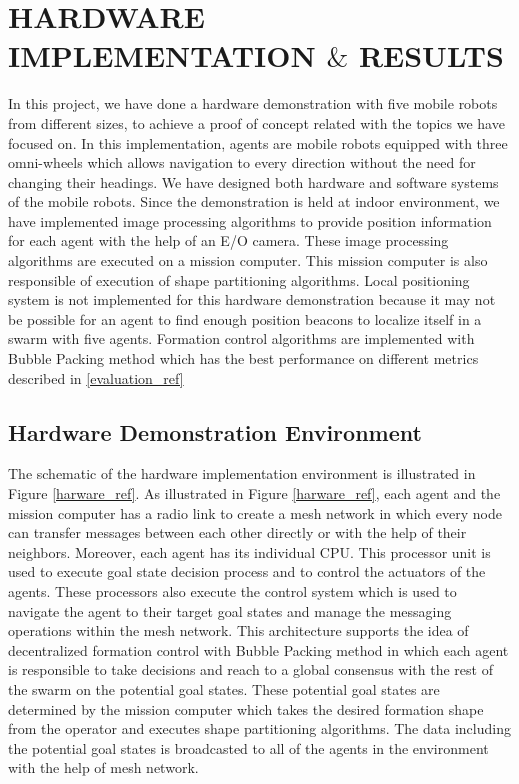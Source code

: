 

\chapter{HARDWARE IMPLEMENTATION $\&$ RESULTS}
\label{chp:hardware}









In this project, we have done a hardware demonstration with five mobile robots from different sizes, to achieve a proof of concept related with the topics we have focused on. In this implementation, agents are mobile robots equipped with three omni-wheels which allows navigation to every direction without the need for changing their headings. We have designed both hardware and software systems of the mobile robots. Since the demonstration is held at indoor environment, we have implemented image processing algorithms to provide  position information for each agent with the help of an E/O camera. These image processing algorithms are executed on a mission computer. This mission computer is also responsible of execution of shape partitioning algorithms. Local positioning system is not implemented for this hardware demonstration because it may not be possible for an agent to find enough position beacons to localize itself in a swarm with five agents. Formation control algorithms are implemented with Bubble Packing method which has the best performance on different metrics described in \ref{evaluation_ref}

\section{Hardware Demonstration Environment}
The schematic of the hardware implementation environment is illustrated in Figure \ref{harware_ref}. As illustrated in Figure \ref{harware_ref}, each agent and the mission computer has a radio link to create a mesh network in which every node can transfer messages between each other directly or with the help of their neighbors. Moreover, each agent has its individual CPU. This processor unit is used to execute goal state decision process and to control the actuators of the agents. These processors also execute the control system which is used to navigate the agent to their target goal states and manage the messaging operations within the mesh network.  This architecture supports the idea of decentralized formation control with Bubble Packing method in which each agent is responsible to take decisions and reach to a global consensus with the rest of the swarm on the potential goal states.  These potential goal states are determined by the mission computer which takes the desired formation shape from the operator and executes shape partitioning algorithms. The data including the potential goal states is broadcasted to all of the agents in the environment with the help of mesh network. 
   
